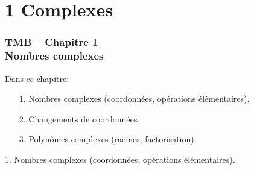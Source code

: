 %
%

\section{1 Complexes}

\begin{frame}%
\frametitle{\bf TMB -- Chapitre 1 \\ 
Nombres complexes}

Dans ce chapitre: 
\begin{itemize}
\item[1.] 
Nombres complexes (coordonnées, opérations élémentaires). 

\item[2.] 
Changements de coordonnées. 

\item[3.] 
Polyn\^omes complexes (racines, factorisation). 
\end{itemize}

\end{frame}


\begin{frame}
\begin{center}
1. Nombres complexes (coordonnées, opérations élémentaires). 
\end{center}
\end{frame}

